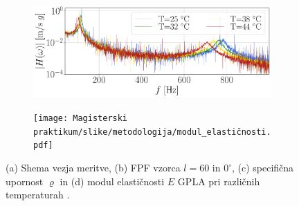             \begin{figure}[!htb]
                \centering
                \begin{subfigure}{.70\textwidth}
                    \centering
                    \includegraphics[width=\linewidth]{Magisterski praktikum/slike/metodologija/FRF.pdf}
                    \caption{}
                    \label{fig:merilna_shema_b}
                \end{subfigure}
                \begin{subfigure}{.70\textwidth}
                    \centering
                    \texttt{[image: Magisterski praktikum/slike/metodologija/modul\_elastičnosti.pdf]}
                    \caption{}
                    \label{fig:modul_elastičnosti}
                \end{subfigure}
                \caption{(a) Shema vezja meritve, (b) FPF vzorca $l=60$ in $0^\circ$, (c) specifična upornost $\varrho$ in (d) modul elastičnosti $E$ GPLA pri različnih temperaturah \cite{Bizjan_2021}.}
            \end{figure}
        
